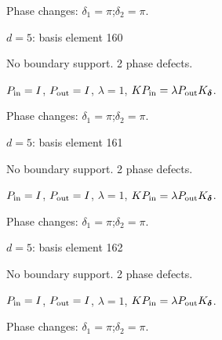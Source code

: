 \par\smallskip\begin{minipage}{.98\linewidth}\small Phase changes: $\delta_{1}=\pi$;\quad $\delta_{2}=\pi$.\end{minipage}
\vfill
{\footnotesize\texttt{}}
\newpage
{}
{\Large $d=5$: basis element 160}\par
No boundary support. 2 phase defects.
\begin{center}
\end{center}
\vspace{-1mm}
$P_{\rm in}=I$, \quad $P_{\rm out}=I$, \quad $\lambda=1$, \qquad $K P_{\rm in}=\lambda P_{\rm out}K_{\boldsymbol\delta}$.
\par\smallskip\begin{minipage}{.98\linewidth}\small Phase changes: $\delta_{1}=\pi$;\quad $\delta_{2}=\pi$.\end{minipage}
\vfill
{\footnotesize\texttt{}}
\newpage
{}
{\Large $d=5$: basis element 161}\par
No boundary support. 2 phase defects.
\begin{center}
\end{center}
\vspace{-1mm}
$P_{\rm in}=I$, \quad $P_{\rm out}=I$, \quad $\lambda=1$, \qquad $K P_{\rm in}=\lambda P_{\rm out}K_{\boldsymbol\delta}$.
\par\smallskip\begin{minipage}{.98\linewidth}\small Phase changes: $\delta_{1}=\pi$;\quad $\delta_{2}=\pi$.\end{minipage}
\vfill
{\footnotesize\texttt{}}
\newpage
{}
{\Large $d=5$: basis element 162}\par
No boundary support. 2 phase defects.
\begin{center}
\end{center}
\vspace{-1mm}
$P_{\rm in}=I$, \quad $P_{\rm out}=I$, \quad $\lambda=1$, \qquad $K P_{\rm in}=\lambda P_{\rm out}K_{\boldsymbol\delta}$.
\par\smallskip\begin{minipage}{.98\linewidth}\small Phase changes: $\delta_{1}=\pi$;\quad $\delta_{2}=\pi$.\end{minipage}
